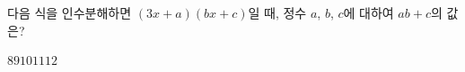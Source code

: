 다음 식을 인수분해하면 $(3x+a)(bx+c)$일 때, 정수 $a$, $b$, $c$에 대하여 $ab+c$의 값은?
\begin{choices32}{$8$}{$9$}{$10$}{$11$}{$12$}\end{choices32}
